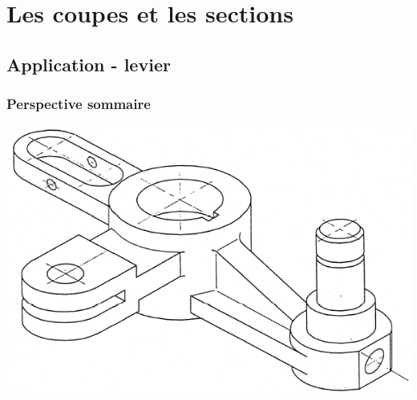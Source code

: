 \documentclass[11pt,oneside]{article}
\begin{document}
\section{Les coupes et les sections}
\subsection*{Application - levier}
\subsubsection*{Perspective sommaire}

\begin{center}
\includegraphics[width=.6\textwidth]{png/fig13}
\end{center}
\end{document}

